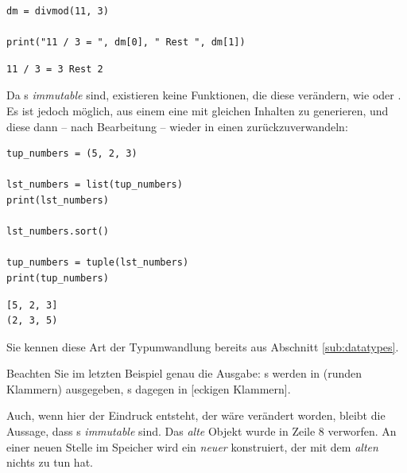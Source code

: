\begin{codebox}
\begin{verbatim}
dm = divmod(11, 3)

print("11 / 3 = ", dm[0], " Rest ", dm[1])
\end{verbatim}
\end{codebox}

\begin{cmdbox}[Ausgabe]
\begin{verbatim}
11 / 3 = 3 Rest 2
\end{verbatim}
\end{cmdbox}

Da s \emph{immutable} sind, existieren keine Funktionen, die diese verändern, wie \eg {} oder . Es ist jedoch möglich, aus einem  eine  mit gleichen Inhalten zu generieren, und diese dann -- nach Bearbeitung -- wieder in einen  zurückzuverwandeln:

\begin{codebox}
\begin{verbatim}
tup_numbers = (5, 2, 3)

lst_numbers = list(tup_numbers)
print(lst_numbers)

lst_numbers.sort()

tup_numbers = tuple(lst_numbers)
print(tup_numbers)
\end{verbatim}
\end{codebox}

\begin{cmdbox}[Ausgabe]
\begin{verbatim}
[5, 2, 3]
(2, 3, 5)
\end{verbatim}
\end{cmdbox}

Sie kennen diese Art der Typumwandlung bereits aus Abschnitt \ref{sub:datatypes}.

\begin{hintbox}
Beachten Sie im letzten Beispiel genau die Ausgabe: s werden in (runden Klammern) ausgegeben, s dagegen in [eckigen Klammern].
\end{hintbox}

Auch, wenn hier der Eindruck entsteht, der  wäre verändert worden, bleibt die Aussage, dass s \emph{immutable} sind. Das \emph{alte} Objekt  wurde in Zeile 8 verworfen. An einer neuen Stelle im Speicher wird ein \emph{neuer}  konstruiert, der mit dem \emph{alten}  nichts zu tun hat.

